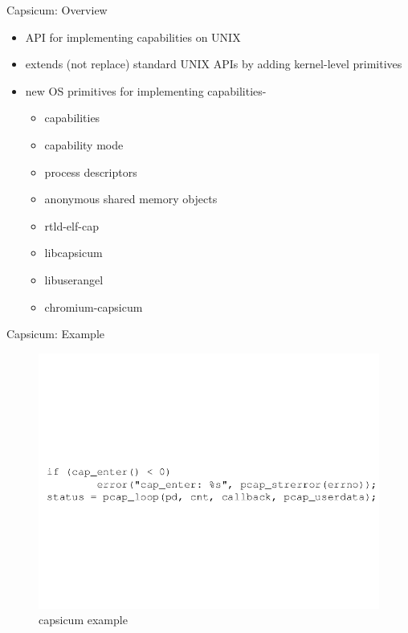 \documentclass[11pt]{beamer}
\begin{document}
\begin{frame}{Capsicum: Overview}
	\begin{itemize}
	\item API for implementing capabilities on UNIX
	\vfill 
	\item extends (not replace) standard UNIX APIs by adding kernel-level primitives
	\vfill
	\item new OS primitives for implementing capabilities-
		\begin{itemize}
		    \item capabilities %
   		    \item capability mode%
    		    \item process descriptors%
    		    \item anonymous shared memory objects%
    		    \item rtld-elf-cap%
    		    \item libcapsicum %
    		    \item libuserangel %
    		    \item chromium-capsicum %

		\end{itemize}
	\end{itemize}
\end{frame}




\begin{frame}{Capsicum: Example}
	\begin{figure}
		  \includegraphics[scale=0.3]{img/tcpdump}
		  \caption{capsicum example}
		  
    \end{figure}  
\end{frame}
\end{document}
